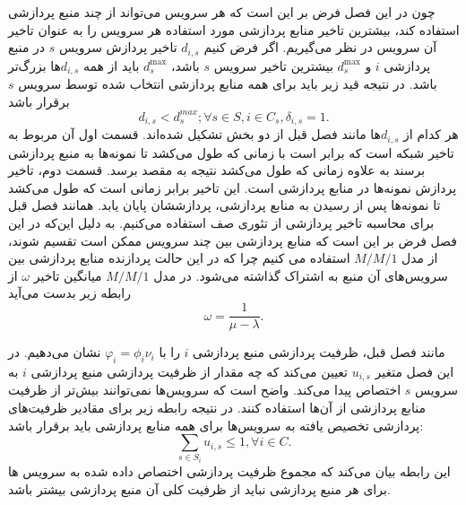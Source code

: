     چون در این فصل فرض بر این است که هر سرویس می‌تواند از چند منبع پردازشی استفاده کند، بیشترین تاخیر منابع پردازشی مورد استفاده هر سرویس‌ را به عنوان تاخیر آن سرویس در نظر می‌گیریم.
    اگر فرض کنیم $d_{i,s}$ تاخیر پردازش سرویس $s$ در منبع پردازشی $i$ و $d_s^\text{max}$ بیشترین تاخیر سرویس $s$ باشد، $d_s^\text{max}$ باید از همه $d_{i,s}$ها بزرگ‌تر باشد.
    در نتیجه قید زیر باید برای همه منابع پردازشی انتخاب شده توسط سرویس $s$ برقرار باشد
    \begin{equation}\label{eqn:max_delay}
      d_{i,s} < d_s^{max}; \forall s \in S, i \in C_s, \delta_{i,s} = 1.
    \end{equation}
    هر کدام از $d_{i,s}$ها مانند فصل قبل از دو بخش تشکیل شده‌اند.
    قسمت اول آن مربوط به تاخیر شبکه است که برابر است با زمانی که طول می‌کشد تا نمونه‌ها به منبع پردازشی برسند به علاوه زمانی که طول می‌کشد نتیجه به مقصد برسد.
    قسمت دوم، تاخیر پردازش نمونه‌ها در منابع پردازشی است.
    این تاخیر برابر زمانی است که طول می‌کشد تا نمونه‌ها پس از رسیدن به منابع پردازشی، پردازششان پایان یابد.
    همانند فصل قبل برای محاسبه تاخیر پردازشی از تئوری صف استفاده می‌کنیم.
    به دلیل این‌که در این فصل فرض بر این است که منابع پردازشی بین چند سرویس ممکن است تقسیم شوند، از مدل $M/M/1$ استفاده می کنیم چرا که در این حالت پردازنده منابع پردازشی بین سرویس‌های آن منبع به اشتراک گذاشته می‌شود.
    در مدل $M/M/1$ میانگین تاخیر $\omega$ از رابطه زیر بدست می‌آید\cite{basic_queueing_sztrik}
    \begin{equation}
      \omega = \frac{1}{\mu-\lambda}.
    \end{equation}

    مانند فصل قبل، ظرفیت پردازشی منبع پردازشی $i$ را با $\varphi_i = \phi_i \nu_i$ نشان می‌دهیم.
    در این فصل متغیر $u_{i,s}$ تعیین می‌کند که چه مقدار از ظرفیت پردازشی منبع پردازشی $i$ به سرویس $s$ اختصاص پیدا می‌کند.
    واضح است که سرویس‌ها نمی‌توانند بیش‌تر از ظرفیت منابع پردازشی از آن‌ها استفاده کنند.
    در نتیجه رابطه زیر برای مقادیر ظرفیت‌های پردازشی تخصیص یافته به سرویس‌ها برای همه منابع پردازشی باید برقرار باشد:
    \begin{equation}
      \sum_{s \in S_i} u_{i,s} \le 1, \forall i \in C.
    \end{equation}
    این رابطه بیان می‌کند که مجموع ظرفیت پردازشی اختصاص داده شده به سرویس ها برای هر منبع پردازشی نباید از ظرفیت کلی آن منبع پردازشی بیشتر باشد.

